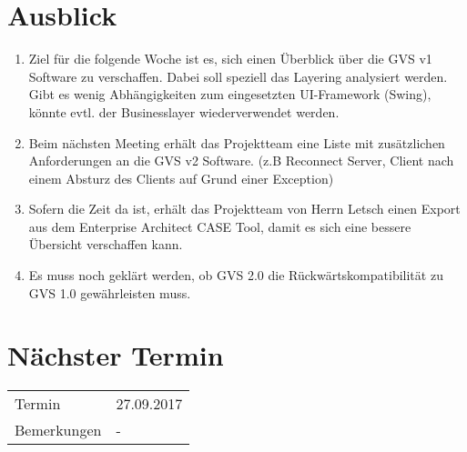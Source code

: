 \documentclass[11pt, a4paper,oneside]{scrartcl}
\begin{document}
\section{Ausblick}
\begin{enumerate}
	\item Ziel für die folgende Woche ist es, sich einen Überblick über die GVS v1 Software zu verschaffen. Dabei soll speziell das Layering analysiert werden. Gibt es wenig Abhängigkeiten zum eingesetzten UI-Framework (Swing), könnte evtl. der Businesslayer wiederverwendet werden.
	\item Beim nächsten Meeting erhält das Projektteam eine Liste mit zusätzlichen Anforderungen an die GVS v2 Software. (z.B Reconnect Server, Client nach einem Absturz des Clients auf Grund einer Exception)
	\item Sofern die Zeit da ist, erhält das Projektteam von Herrn Letsch einen Export aus dem Enterprise Architect CASE Tool, damit es sich eine bessere Übersicht verschaffen kann.
	\item Es muss noch geklärt werden, ob GVS 2.0 die Rückwärtskompatibilität zu GVS 1.0 gewährleisten muss.
\end{enumerate}

\section{Nächster Termin}
\begin{tabu} to \linewidth {l X }
	\toprule
	Termin & 27.09.2017 \\
	Bemerkungen & - \\
	\bottomrule
\end{tabu}
\end{document}
